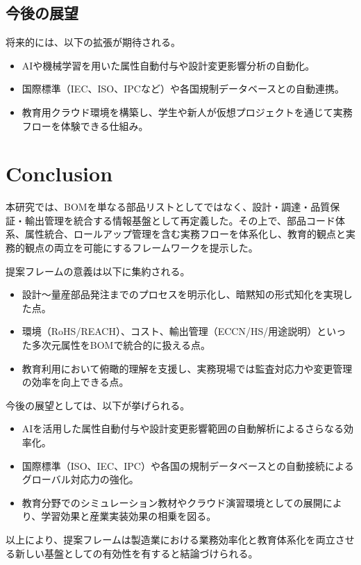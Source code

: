 \documentclass[10pt,conference]{IEEEtran}
\begin{document}
\subsection{今後の展望}
将来的には、以下の拡張が期待される。
\begin{itemize}
  \item AIや機械学習を用いた属性自動付与や設計変更影響分析の自動化。
  \item 国際標準（IEC、ISO、IPCなど）や各国規制データベースとの自動連携。
  \item 教育用クラウド環境を構築し、学生や新人が仮想プロジェクトを通じて実務フローを体験できる仕組み。
\end{itemize}

\section{Conclusion}
本研究では、BOMを単なる部品リストとしてではなく、設計・調達・品質保証・輸出管理を統合する情報基盤として再定義した。その上で、部品コード体系、属性統合、ロールアップ管理を含む実務フローを体系化し、教育的観点と実務的観点の両立を可能にするフレームワークを提示した。

提案フレームの意義は以下に集約される。
\begin{itemize}
  \item 設計～量産部品発注までのプロセスを明示化し、暗黙知の形式知化を実現した点。
  \item 環境（RoHS/REACH）、コスト、輸出管理（ECCN/HS/用途説明）といった多次元属性をBOMで統合的に扱える点。
  \item 教育利用において俯瞰的理解を支援し、実務現場では監査対応力や変更管理の効率を向上できる点。
\end{itemize}

今後の展望としては、以下が挙げられる。
\begin{itemize}
  \item AIを活用した属性自動付与や設計変更影響範囲の自動解析によるさらなる効率化。
  \item 国際標準（ISO、IEC、IPC）や各国の規制データベースとの自動接続によるグローバル対応力の強化。
  \item 教育分野でのシミュレーション教材やクラウド演習環境としての展開により、学習効果と産業実装効果の相乗を図る。
\end{itemize}

以上により、提案フレームは製造業における業務効率化と教育体系化を両立させる新しい基盤としての有効性を有すると結論づけられる。
\end{document}
